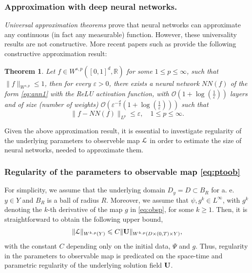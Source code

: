 \documentclass[a4paper]{article}
\numberwithin{equation}{section}
\newtheorem{theorem}{Theorem}[section]
\numberwithin{equation}{section}
\theoremstyle{definition}
\theoremstyle{myremarkstyle}
\renewcommand{\geq}{\geqslant}
\renewcommand{\leq}{\leqslant}
\renewcommand{\epsilon}{\varepsilon}
\newcommand{\R}{\mathbb{R}}
\newcommand{\U}{{\bf U}}		%
\newcommand{\cO}{{\mathcal O}}
\newcommand{\map}{\EuScript{L}}
\begin{document}
\subsubsection{Approximation with deep neural networks.} 
\label{sec:approx}
 \emph{Universal approximation theorems} \cite{Bar1,Kor1,Cy1} prove that neural networks can approximate any continuous (in fact any measurable) function. However, these universality results are not constructive. More recent papers such as \cite{YAR1,Pet2} provide the following constructive approximation result:
 \begin{theorem}
\label{theo:1} Let $f \in W^{s,p}\left([0,1]^d,\R\right)$ for some $1 \leq p \leq \infty$, such that $\|f\|_{W^{s,p}} \leq 1$, then for every $\epsilon > 0$, there exists a neural network $NN(f)$ of the form \eqref{eq:ann1} with the ReLU activation function, with $\cO\left(1 + \log\left(\frac{1}{\epsilon}\right)\right)$ layers and of size (number of weights) $\cO\left(\epsilon^{-\frac{d}{s}}\left(1 + \log\left(\frac{1}{\epsilon} \right)\right)\right)$ such that
\begin{equation}
\label{eq:approx1}
\|f - NN(f) \|_{L^p} \leq \epsilon, \quad 1 \leq p \leq \infty.
\end{equation}

\end{theorem}
Given the above approximation result, it is essential to investigate regularity of the underlying parameters to observeble map $\map$ in order to estimate the size of neural networks, needed to approximate them. 
\subsubsection{Regularity of the parameters to observable map \eqref{eq:ptoob}}
\label{sec:reg}
For simplicity, we assume that the underlying domain $D_y = D \subset B_R$ for a. e. $y \in Y$ and $B_R$ is a ball of radius $R$. Moreover, we assume that $\psi, g^k \in L^{\infty}$, with $g^k$ denoting the $k$-th derivative of the map $g$ in \eqref{eq:obsp}, for some $k \geq 1$. Then, it is straightforward to obtain the following upper bound,
\begin{equation}
\label{eq:reg1}
\|\map\|_{W^{k,p}(Y)} \leq C \|\U\|_{W^{k,p}(D\times(0,T) \times Y)},
\end{equation}
with the constant $C$ depending only on the initial data, $\Psi$ and $g$. Thus, regularity in the parameters to observable map is predicated on the space-time and parametric regularity of the underlying solution field $\U$.
\end{document}
